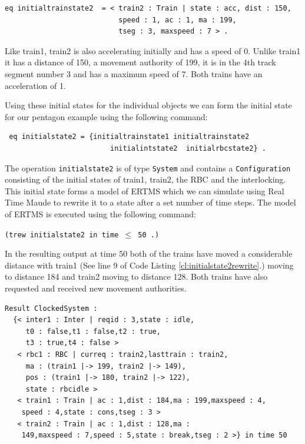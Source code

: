 \begin{lstlisting}[caption = The intial state of train2 in Maude]
eq initialtrainstate2  = < train2 : Train | state : acc, dist : 150, 
                           speed : 1, ac : 1, ma : 199,
                           tseg : 3, maxspeed : 7 > .
\end{lstlisting}
Like train1, train2 is also accelerating initially and has a speed of 0.  Unlike train1 it has a distance of 150, a movement authority of 199, it is in the 4th track segment number 3 and has a maximum speed of 7. Both trains have an acceleration of 1. 

Using these initial states for the individual objects we can form the initial state for our pentagon example using the following command:
\begin{lstlisting}
 eq initialstate2 = {initialtrainstate1 initialtrainstate2 
                         initialintstate2  initialrbcstate2} . 
\end{lstlisting}
The operation \texttt{initialstate2} is of type \texttt{System} and contains a \texttt{Configuration} consisting of the initial states of train1, train2, the RBC and the interlocking. This initial state forms a model of ERTMS which we can simulate using Real Time Maude to rewrite it to a state after a set number of time steps. The model of ERTMS is executed using the following command:
\begin{center}
\texttt{(trew initialstate2 in time $\leq$ 50 .)}
\end{center}

In the resulting output at time 50 both of the trains have moved a considerable distance with train1 (See line 9 of Code Listing \ref{cl:initialstate2rewrite}.) moving to distance 184 and train2 moving to distance 128. Both trains have also requested and received new movement authorities.
 
\begin{lstlisting}[caption = The result of rewriting initialstate2 for 50 time steps, label = cl:initialstate2rewrite]
Result ClockedSystem :
  {< inter1 : Inter | reqid : 3,state : idle,
     t0 : false,t1 : false,t2 : true,
     t3 : true,t4 : false > 
   < rbc1 : RBC | curreq : train2,lasttrain : train2,
     ma : (train1 |-> 199, train2 |-> 149),
     pos : (train1 |-> 180, train2 |-> 122),
     state : rbcidle > 
   < train1 : Train | ac : 1,dist : 184,ma : 199,maxspeed : 4,
    speed : 4,state : cons,tseg : 3 > 
   < train2 : Train | ac : 1,dist : 128,ma :
    149,maxspeed : 7,speed : 5,state : break,tseg : 2 >} in time 50
\end{lstlisting}

